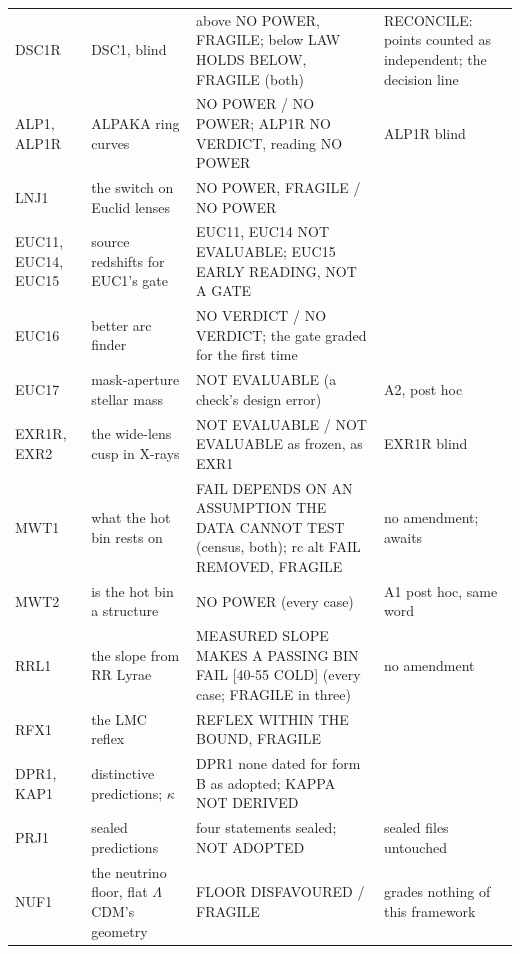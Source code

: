 \documentclass[10pt]{article}
\begin{document}
{\begin{longtable}{@{}p{1.9cm}p{3.6cm}p{5.6cm}p{4.6cm}@{}}
DSC1R & DSC1, blind & above NO POWER, FRAGILE; below LAW HOLDS BELOW, FRAGILE (both) & RECONCILE: points counted as independent; the decision line\\
ALP1, ALP1R & ALPAKA ring curves & NO POWER / NO POWER; ALP1R NO VERDICT, reading NO POWER & ALP1R blind\\
LNJ1 & the switch on Euclid lenses & NO POWER, FRAGILE / NO POWER & \\
EUC11, EUC14, EUC15 & source redshifts for EUC1's gate & EUC11, EUC14 NOT EVALUABLE; EUC15 EARLY READING, NOT A GATE & \\
EUC16 & better arc finder & NO VERDICT / NO VERDICT; the gate graded for the first time & \\
EUC17 & mask-aperture stellar mass & NOT EVALUABLE (a check's design error) & A2, post hoc\\
EXR1R, EXR2 & the wide-lens cusp in X-rays & NOT EVALUABLE / NOT EVALUABLE as frozen, as EXR1 & EXR1R blind\\
MWT1 & what the hot bin rests on & FAIL DEPENDS ON AN ASSUMPTION THE DATA CANNOT TEST (census, both); rc alt FAIL REMOVED, FRAGILE & no amendment; awaits\\
MWT2 & is the hot bin a structure & NO POWER (every case) & A1 post hoc, same word\\
RRL1 & the slope from RR Lyrae & MEASURED SLOPE MAKES A PASSING BIN FAIL [40-55 COLD] (every case; FRAGILE in three) & no amendment\\
RFX1 & the LMC reflex & REFLEX WITHIN THE BOUND, FRAGILE & \\
DPR1, KAP1 & distinctive predictions; $\kappa$ & DPR1 none dated for form B as adopted; KAPPA NOT DERIVED & \\
PRJ1 & sealed predictions & four statements sealed; NOT ADOPTED & sealed files untouched\\
NUF1 & the neutrino floor, flat $\Lambda$CDM's geometry & FLOOR DISFAVOURED / FRAGILE & grades nothing of this framework\\\bottomrule
\end{longtable}}
\end{document}
